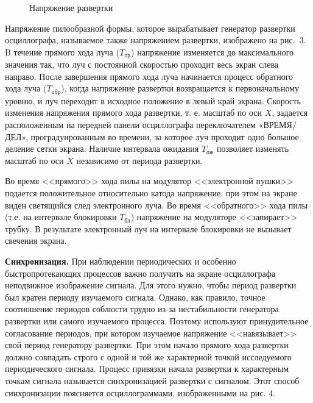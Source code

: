 \documentclass[14pt]{article}
\begin{document}
\begin{figure}[h!]
	\caption{Напряжение развертки}
	\label{fig:image}
\end{figure}

Напряжение пилообразной формы, которое вырабатывает генератор развертки осциллографа, называемое также напряжением развертки, изображено на рис.~3. B течение прямого хода луча ($T_{\text{пр}}$) напряжение изменяется до максимального значения так, что луч с постоянной скоростью проходит весь экран слева направо. После завершения прямого хода луча начинается процесс обратного хода луча 
($T_{\text{обр}}$), когда напряжение развертки возвращается к первоначальному уровню, и луч переходит в исходное положение в левый край экрана. Скорость изменения напряжения прямого хода развертки, т. е. масштаб по оси $X$, задается расположенным на передней панели осциллографа переключателем «ВРЕМЯ/ДЕЛ», проградуированным во времени, за которое луч проходит одно большое деление сетки экрана. Наличие интервала ожидания $T_{\text{ож}}$ позволяет изменять масштаб по оси $X$ независимо от периода развертки.

Во время <<прямого>> хода пилы на модулятор <<электронной пушки>> подается положительное относительно катода напряжение, при этом на экране виден светящийся след электронного луча. Во время <<обратного>> хода пилы (т.е. на интервале блокировки $T_{\text{бл}}$) напряжение на модуляторе <<запирает>> трубку. В результате электронный луч на интервале блокировки не вызывает свечения экрана.

%
%

\vspace{0.5cm}
\textbf{Синхронизация.} При наблюдении периодических и особенно быстропротекающих процессов важно получить на экране осциллографа неподвижное изображение сигнала. Для этого нужно, чтобы период развертки был кратен периоду изучаемого сигнала. Однако, как правило, точное соотношение периодов соблюсти трудно из-за нестабильности генератора развертки или самого изучаемого процесса. Поэтому используют принудительное согласование периодов, при котором изучаемое напряжение <<навязывает>> свой период генератору развертки. При этом начало прямого хода развертки должно совпадать строго с одной и той же характерной точкой исследуемого периодического сигнала. Процесс привязки начала развертки к характерным точкам сигнала называется синхронизацией развертки с сигналом. Этот способ синхронизации поясняется осциллограммами, изображенными на рис. 4.
\end{document}
